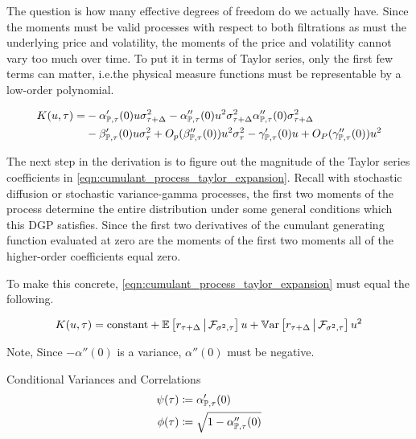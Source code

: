 \documentclass[11pt, letterpaper, twoside, final]{article}
\begin{document}
The question is how many effective degrees of freedom do we actually have.
Since the moments must be valid processes with respect to both filtrations as must the underlying price and
volatility, the moments of the price and volatility cannot vary too much over time.
To put it in terms of Taylor series, only the first few terms can matter, i.e.\@ the physical measure functions
must be representable by a low-order polynomial.


\begin{equation}
    \label{eqn:cumulant_process_taylor_expansion}
    \begin{alignedat}{2}
        K(u, \tau) &= &&- \alpha_{\mathbb{P}, \tau}'(0) u \sigma^2_{\tau + \Delta} - \alpha_{\mathbb{P}, \tau}''(0) u^2
            \sigma^2_{\tau + \Delta} \alpha_{\mathbb{P}, \tau}''(0) \sigma^2_{\tau + \Delta}  \\ 
        & &&- \beta_{\mathbb{P}, \tau}'(0) u\sigma^2_{\tau} + O_p(\beta_{\mathbb{P}, \tau}''(0)) u^2 \sigma^2_{\tau} -
          \gamma_{\mathbb{P}, \tau}'(0)u  + O_P(\gamma_{\mathbb{P}, \tau}''(0)) u^2 \\
    \end{alignedat}
\end{equation}

The next step in the derivation is to figure out the magnitude of the Taylor series coefficients in
\cref{eqn:cumulant_process_taylor_expansion}.
Recall with stochastic diffusion or stochastic variance-gamma processes, the first two moments of the
process determine the entire distribution under some general conditions which this DGP satisfies.
Since the first two derivatives of the cumulant generating function evaluated at zero are the moments of the first
two moments all of the higher-order coefficients  equal zero.

To make this concrete, \cref{eqn:cumulant_process_taylor_expansion} must equal the following. 


\begin{equation}
    \label{eqn:cond_log_cumulant_function}
    K(u, \tau) = \text{constant} + \operatorname{\mathbb{E}}\left[r_{\tau + \Delta} \,\middle\vert\, \mathcal{F}_{\sigma^2, \tau}\right]  u  +
    \operatorname{\mathbb{V}ar}\left[r_{\tau + \Delta} \,\middle\vert\, \mathcal{F}_{\sigma^2, \tau}\right]  u^2 
\end{equation}

Note, Since $-\alpha''(0)$ is a variance, $\alpha''(0)$ must be negative.

\begin{defn}{Conditional Variances and Correlations} 
    \begin{align}
        \psi(\tau) &\coloneqq \alpha_{\mathbb{P}, \tau}'(0) \\
        \phi(\tau) &\coloneqq \sqrt{1 -\alpha_{\mathbb{P}, \tau}''(0)}
    \end{align}
\end{defn}
\end{document}
